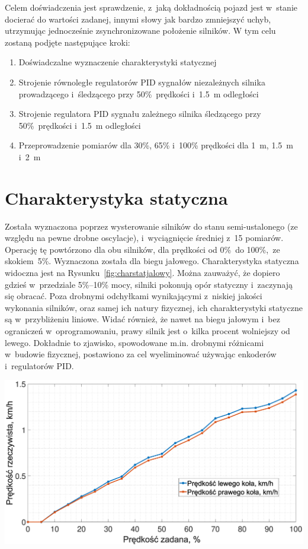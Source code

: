\label{ch:experiment}
Celem doświadczenia jest sprawdzenie, z~jaką dokładnością pojazd jest w~stanie docierać do wartości zadanej, innymi słowy jak bardzo zmniejszyć uchyb, utrzymując jednocześnie zsynchronizowane położenie silników. W tym celu zostaną podjęte następujące kroki:

\begin{enumerate}
    \item Doświadczalne wyznaczenie charakterystyki statycznej
    \item Strojenie równoległe regulatorów PID sygnałów niezależnych silnika prowadzącego i~śledzącego przy 50\%~prędkości i~1.5~m odległości
    \item Strojenie regulatora PID sygnału zależnego silnika śledzącego przy 50\%~prędkości i~1.5~m odległości
    \item Przeprowadzenie pomiarów dla 30\%, 65\% i~100\% prędkości dla 1~m, 1.5~m i~2~m
\end{enumerate}

\section{Charakterystyka statyczna}
Została wyznaczona poprzez wysterowanie silników do stanu semi-ustalonego (ze względu na pewne drobne oscylacje), i~wyciągnięcie średniej z~15 pomiarów. Operację tę powtórzono dla obu silników, dla prędkości od 0\%~do 100\%,~ze skokiem~5\%. Wyznaczona została dla biegu jałowego. Charakterystyka statyczna widoczna jest na Rysunku~\ref{fig:charstatjalowy}. Można zauważyć, że dopiero gdzieś w~przedziale 5\%--10\% mocy, silniki pokonują opór statyczny i~zaczynają się obracać. Poza drobnymi odchyłkami wynikającymi z~niskiej jakości wykonania silników, oraz samej ich natury fizycznej, ich charakterystyki statyczne są w~przybliżeniu liniowe. Widać również, że nawet na biegu jałowym i~bez ograniczeń w~oprogramowaniu, prawy silnik jest o~kilka procent wolniejszy od lewego. Dokładnie to zjawisko, spowodowane m.in. drobnymi różnicami w~budowie fizycznej, postawiono za cel wyeliminować używając enkoderów i~regulatorów PID.

\begin{center}
    \includegraphics[scale=0.31]{images/charStat.eps}
    \label{fig:charstatjalowy}
\end{center}
\vspace*{-1cm}

